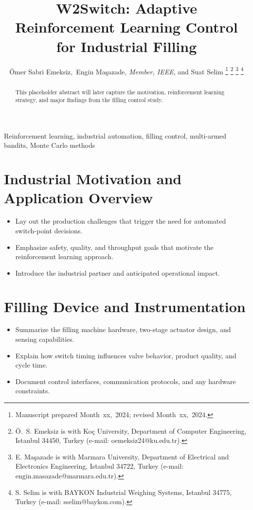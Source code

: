 \documentclass[journal]{IEEEtranTIE}
\begin{document}
\title{W2Switch: Adaptive Reinforcement Learning Control for Industrial Filling}


\author{%
\"{O}mer Sabri Emeksiz,\ Engin Ma\c{s}azade, \emph{Member, IEEE},
and Suat Selim%
\thanks{Manuscript prepared Month~xx,~2024; revised Month~xx,~2024.}
\thanks{\"{O}.~S. Emeksiz is with Ko\c{c} University, Department of Computer Engineering, Istanbul 34450, Turkey (e-mail: oemeksiz24@ku.edu.tr).}
\thanks{E. Ma\c{s}azade is with Marmara University, Department of Electrical and Electronics Engineering, Istanbul 34722, Turkey (e-mail: engin.masazade@marmara.edu.tr).}
\thanks{S. Selim is with BAYKON Industrial Weighing Systems, Istanbul 34775, Turkey (e-mail: sselim@baykon.com).}}

\maketitle

\begin{abstract}
This placeholder abstract will later capture the motivation, reinforcement learning strategy, and major findings from the filling control study.
\end{abstract}

\begin{IEEEkeywords}
Reinforcement learning, industrial automation, filling control, multi-armed bandits, Monte Carlo methods
\end{IEEEkeywords}


\section{Industrial Motivation and Application Overview}
\begin{itemize}
  \item Lay out the production challenges that trigger the need for automated switch-point decisions.
  \item Emphasize safety, quality, and throughput goals that motivate the reinforcement learning approach.
  \item Introduce the industrial partner and anticipated operational impact.
\end{itemize}

\section{Filling Device and Instrumentation}
\begin{itemize}
  \item Summarize the filling machine hardware, two-stage actuator design, and sensing capabilities.
  \item Explain how switch timing influences valve behavior, product quality, and cycle time.
  \item Document control interfaces, communication protocols, and any hardware constraints.
\end{itemize}
\end{document}
